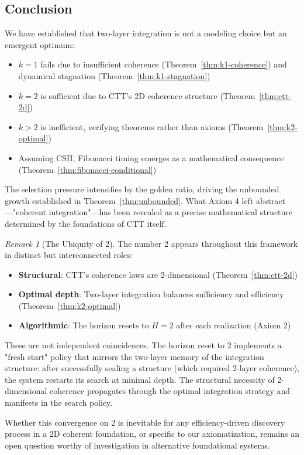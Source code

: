 \documentclass[11pt]{article}
\theoremstyle{definition}
\theoremstyle{plain}
\theoremstyle{remark}
\newtheorem{remark}{Remark}
\begin{document}
\subsection{Conclusion}

We have established that two-layer integration is not a modeling choice but an emergent optimum:
\begin{itemize}
\item $k=1$ fails due to insufficient coherence (Theorem~\ref{thm:k1-coherence}) and dynamical stagnation (Theorem~\ref{thm:k1-stagnation})
\item $k=2$ is sufficient due to CTT's 2D coherence structure (Theorem~\ref{thm:ctt-2d})
\item $k>2$ is inefficient, verifying theorems rather than axioms (Theorem~\ref{thm:k2-optimal})
\item Assuming CSH, Fibonacci timing emerges as a mathematical consequence (Theorem~\ref{thm:fibonacci-conditional})
\end{itemize}

The selection pressure intensifies by the golden ratio, driving the unbounded growth established in Theorem~\ref{thm:unbounded}. What Axiom 4 left abstract—"coherent integration"—has been revealed as a precise mathematical structure determined by the foundations of CTT itself.

\begin{remark}[The Ubiquity of 2]
The number 2 appears throughout this framework in distinct but interconnected roles:
\begin{itemize}
\item \textbf{Structural}: CTT's coherence laws are 2-dimensional (Theorem~\ref{thm:ctt-2d})
\item \textbf{Optimal depth}: Two-layer integration balances sufficiency and efficiency (Theorem~\ref{thm:k2-optimal})
\item \textbf{Algorithmic}: The horizon resets to $H=2$ after each realization (Axiom 2)
\end{itemize}

These are not independent coincidences. The horizon reset to 2 implements a "fresh start" policy that mirrors the two-layer memory of the integration structure: after successfully sealing a structure (which required 2-layer coherence), the system restarts its search at minimal depth. The structural necessity of 2-dimensional coherence propagates through the optimal integration strategy and manifests in the search policy.

Whether this convergence on 2 is inevitable for any efficiency-driven discovery process in a 2D coherent foundation, or specific to our axiomatization, remains an open question worthy of investigation in alternative foundational systems.
\end{remark}
\end{document}
